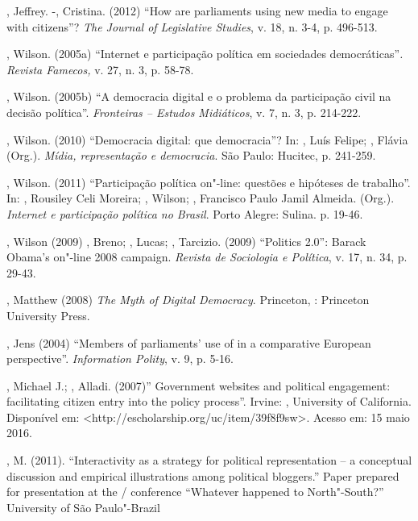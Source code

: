 \begin{Parskip}
, Jeffrey. -, Cristina. (2012) ``How are
parliaments using new media to engage with citizens''? \emph{The Journal
of Legislative Studies}, v. 18, n. 3-4, p. 496-513.

, Wilson. (2005a) ``Internet e participação política em sociedades
democráticas''\emph{. Revista Famecos,} v. 27, n. 3, p. 58-78.

, Wilson. (2005b) ``A democracia digital e o problema da
participação civil na decisão política''. \emph{Fronteiras -- Estudos
Midiáticos}, v. 7, n. 3, p. 214-222.

, Wilson. (2010) ``Democracia digital: que democracia''? In:
, Luís Felipe; , Flávia (Org.). \emph{Mídia, representação e
democracia}. São Paulo: Hucitec, p. 241-259.

, Wilson. (2011) ``Participação política on"-line: questões e
hipóteses de trabalho''. In: , Rousiley Celi Moreira; , Wilson;
, Francisco Paulo Jamil Almeida. (Org.). \emph{Internet e
participação política no Brasil}. Porto Alegre: Sulina. p. 19-46.

, Wilson (2009) , Breno; , Lucas; , Tarcizio.
(2009) ``Politics 2.0'': Barack Obama's on"-line 2008 campaign.
\emph{Revista de Sociologia e Política}, v. 17, n. 34, p. 29-43.

, Matthew (2008) \emph{The Myth of Digital Democracy}. Princeton,
: Princeton University Press.

, Jens (2004) ``Members of parliaments' use of  in a comparative
European perspective''. \emph{Information Polity}, v. 9, p. 5-16.

, Michael J.; , Alladi. (2007)'' Government websites and
political engagement: facilitating citizen entry into the policy
process''. Irvine: , University of California. Disponível em:
\textless{}http://escholarship.org/uc/item/39f8f9sw\textgreater{}.
Acesso em: 15 maio 2016.

, M. (2011). ``Interactivity as a strategy for political
representation -- a conceptual discussion and empirical illustrations
among political bloggers.'' Paper prepared for presentation at the
/ conference ``Whatever happened to North"-South?'' University of
São Paulo"-Brazil


\end{Parskip}
